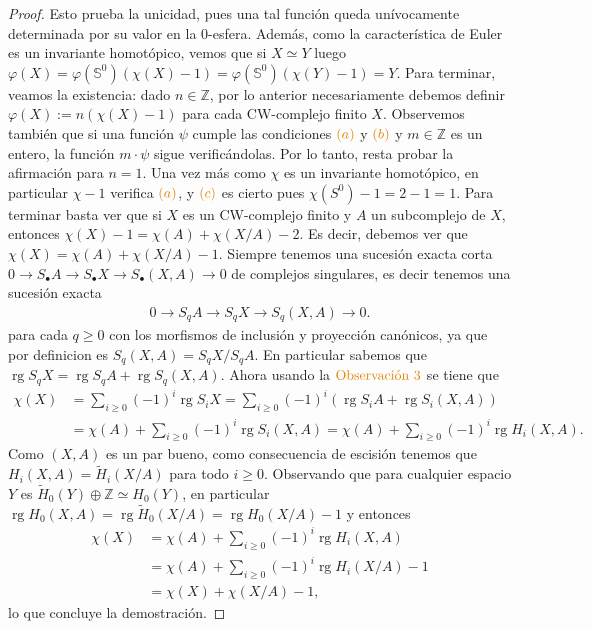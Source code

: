 \documentclass[11pt]{article}
\newcommand{\Z}{\mathbb{Z}}
\newcommand{\Ss}{\mathbb{S}}
\newcommand{\rg}{\operatorname{rg}}
\newcommand{\paint}[2]{\color{#1}{#2}}
\begin{document}
\begin{proof}
Esto prueba la unicidad, pues una tal funci\'on queda un\'ivocamente determinada por su valor en la $0$-esfera. Adem\'as, como la caracter\'istica de Euler es un invariante homot\'opico, vemos que si $X \simeq Y$ luego $\varphi(X) = \varphi(\Ss^0)(\chi(X)-1) = \varphi(\Ss^0)(\chi(Y)-1) = Y$. Para terminar, veamos la existencia: dado $n \in \Z$, por lo anterior necesariamente debemos definir $\varphi(X) := n(\chi(X)-1)$ para cada CW-complejo finito $X$. Observemos tambi\'en que si una funci\'on $\psi$ cumple las condiciones $\paint{orange}{(a)}$ y $\paint{orange}{(b)}$ y $m \in \Z$ es un entero, la funci\'on $m \cdot \psi$ sigue verific\'andolas. Por lo tanto, resta probar la afirmaci\'on para $n = 1$. Una vez m\'as como $\chi$ es un invariante homot\'opico, en particular $\chi -1$ verifica $\paint{orange}{(a)}$, y $\paint{orange}{(c)}$ es cierto pues $\chi(S^0)-1 = 2-1 = 1$. Para terminar basta ver que si $X$ es un CW-complejo finito y $A$ un subcomplejo de $X$, entonces $\chi(X) -1 = \chi(A) + \chi(X/A) -2$. Es decir, debemos ver que $\chi(X) = \chi(A) + \chi(X/A) -1$. Siempre tenemos una sucesi\'on exacta corta $0 \to S_\bullet A \to S_\bullet X \to S_\bullet(X,A) \to 0$ de complejos singulares, es decir tenemos una sucesi\'on exacta
\begin{align*}
0 \to S_q A \to S_q X \to S_q(X,A) \to 0.
\end{align*}
para cada $q \geq 0$ con los morfismos de inclusi\'on y proyecci\'on can\'onicos, ya que por definicion es $S_q(X,A) = S_qX/S_qA$. En particular sabemos que $\rg S_qX = \rg S_qA + \rg S_q(X,A)$. Ahora usando la $\paint{orange}{\text{Observaci\'on $3$}}$ se tiene que
\begin{align*}
\chi(X) &= \sum_{i \geq 0}(-1)^i \rg S_iX = \sum_{i \geq 0}(-1)^i(\rg S_iA + \rg S_i(X,A))\\
&= \chi(A) + \sum_{i \geq 0}(-1)^i\rg S_i(X,A) = \chi(A) + \sum_{i \geq 0}(-1)^i\rg H_i(X,A).
\end{align*}
Como $(X,A)$ es un par bueno, como consecuencia de escisi\'on tenemos que $H_i(X,A) = \tilde{H}_i(X/A)$ para todo $i \geq 0$. Observando que para cualquier espacio $Y$ es $\tilde{H}_0(Y) \oplus \Z \simeq H_0(Y)$, en particular $\rg H_0(X,A) = \rg \tilde{H}_0(X/A) = \rg H_0(X/A) -1$ y entonces
\begin{align*}
\chi(X) &= \chi(A) + \sum_{i \geq 0}(-1)^i\rg H_i(X,A)\\
&= \chi(A) + \sum_{i \geq 0}(-1)^i\rg H_i(X/A) - 1\\
&= \chi(X) + \chi(X/A) -1,
\end{align*}
lo que concluye la demostraci\'on.
\end{proof}
\end{document}
